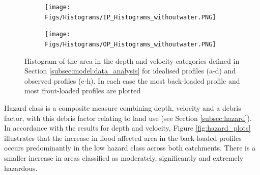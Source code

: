 \documentclass[APA,Times2COL]{WileyNJDv5}
\begin{document}
\begin{figure}[!t] 
\begin{subfigure}[H]{\linewidth}
\texttt{[image: Figs/Histograms/IP\_Histograms\_withoutwater.PNG]}
\end{subfigure}
\begin{subfigure}[H]{\linewidth}
\texttt{[image: Figs/Histograms/OP\_Histograms\_withoutwater.PNG]}
\end{subfigure}
\caption{Histogram of the area in the depth and velocity categories defined in Section \ref{subsec:model:data_analysis} for idealised profiles (a-d) and observed profiles (e-h). In each case the most back-loaded profile and most front-loaded profiles are plotted} \label{fig:histograms} 
\end{figure}


Hazard class is a composite measure combining depth, velocity and a debris factor, with this debris factor relating to land use (see Section \ref{subsec:hazard}). In accordance with the results for depth and velocity, Figure \ref{fig:hazard_plots} illustrates that the increase in flood affected area in the back-loaded profiles occurs predominantly in the low hazard class across both catchments. There is a smaller increase in areas classified as moderately, significantly and extremely hazardous.
\end{document}
